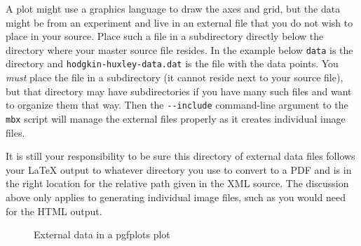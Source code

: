 \documentclass[10pt,]{article}
\theoremstyle{plain}
\theoremstyle{definition}
\theoremstyle{definition}
\theoremstyle{definition}
\theoremstyle{definition}
\theoremstyle{definition}
\theoremstyle{definition}
\numberwithin{equation}{section}
\begin{document}
\hypertarget{p-256}{}%
A plot might use a graphics language to draw the axes and grid, but the data might be from an experiment and live in an external file that you do not wish to place in your source.  Place such a file in a subdirectory directly below the directory where your master source file resides.  In the example below \lstinline?data? is the directory and \lstinline?hodgkin-huxley-data.dat? is the file with the data points.  You \emph{must} place the file in a subdirectory (it cannot reside next to your source file), but that directory may have subdirectories if you have many such files and want to organize them that way.  Then the \lstinline?--include? command-line argument to the \lstinline?mbx? script will manage the external files properly as it creates individual image files.%
\par
\hypertarget{p-257}{}%
It is still your responsibility to be sure this directory of external data files follows your \LaTeX{} output to whatever directory you use to convert to a PDF and is in the right location for the relative path given in the XML source.  The discussion above only applies to generating individual image files, such as you would need for the HTML output.%
\begin{figure}
\centering
{
\tikzset{%
}
}
\caption{External data in a pgfplots plot\label{figure-pgfplots-data-demo}}
\end{figure}
\typeout{************************************************}
\typeout{************************************************}
\end{document}
